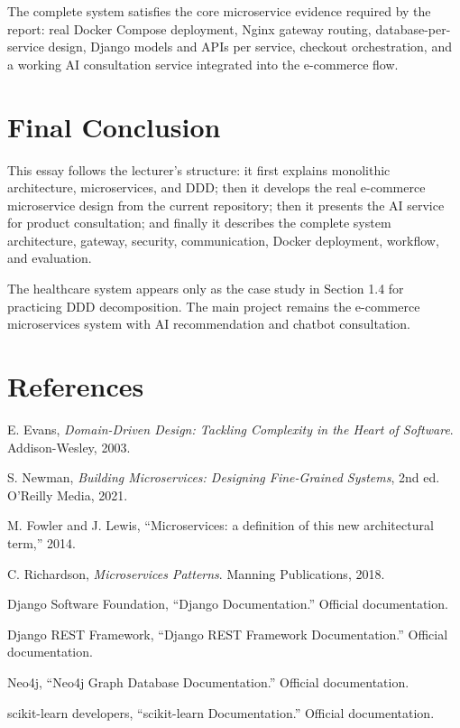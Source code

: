 \documentclass[12pt,a4paper]{article}
\begin{document}
The complete system satisfies the core microservice evidence required by the report: real Docker Compose deployment, Nginx gateway routing, database-per-service design, Django models and APIs per service, checkout orchestration, and a working AI consultation service integrated into the e-commerce flow.

\section*{Final Conclusion}

This essay follows the lecturer's structure: it first explains monolithic architecture, microservices, and DDD; then it develops the real e-commerce microservice design from the current repository; then it presents the AI service for product consultation; and finally it describes the complete system architecture, gateway, security, communication, Docker deployment, workflow, and evaluation.

The healthcare system appears only as the case study in Section 1.4 for practicing DDD decomposition. The main project remains the e-commerce microservices system with AI recommendation and chatbot consultation.

\section*{References}

\begin{enumerate}[label={[\arabic*]}]
    \item E. Evans, \textit{Domain-Driven Design: Tackling Complexity in the Heart of Software}. Addison-Wesley, 2003.
    \item S. Newman, \textit{Building Microservices: Designing Fine-Grained Systems}, 2nd ed. O'Reilly Media, 2021.
    \item M. Fowler and J. Lewis, ``Microservices: a definition of this new architectural term,'' 2014.
    \item C. Richardson, \textit{Microservices Patterns}. Manning Publications, 2018.
    \item Django Software Foundation, ``Django Documentation.'' Official documentation.
    \item Django REST Framework, ``Django REST Framework Documentation.'' Official documentation.
    \item Neo4j, ``Neo4j Graph Database Documentation.'' Official documentation.
    \item scikit-learn developers, ``scikit-learn Documentation.'' Official documentation.
\end{enumerate}
\end{document}

